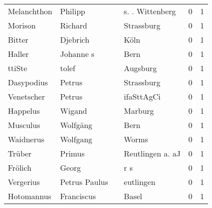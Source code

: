 \documentclass[10pt,a4paper,landscape]{article}
\begin{document}
\begin{longtable}{llllrr}
              Melanchthon &                            Philipp &             &                             s. . Wittenberg &          0 &         1 \\
                  Morison &                            Richard &             &                                  Strassburg &          0 &         1 \\
                   Bitter &                           Djebrich &             &                                        Köln &          0 &         1 \\
                   Haller &                          Johanne s &             &                                        Bern &          0 &         1 \\
                   ttiSte &                              tolef &             &                                    Augsburg &          0 &         1 \\
               Dasypodius &                             Petrus &             &                                  Strassburg &          0 &         1 \\
               Venetscher &                             Petrus &             &                                  ifaSttAgCi &          0 &         1 \\
                 Happelus &                             Wigand &             &                                     Marburg &          0 &         1 \\
                 Musculus &                           Wolfgäng &             &                                        Bern &          0 &         1 \\
                Waidnerus &                           Wolfgang &             &                                       Worms &          0 &         1 \\
                   Trüber &                             Primus &             &                            Reutlingen a. aJ &          0 &         1 \\
                  Frölich &                              Georg &             &                                         r s &          0 &         1 \\
                Vergerius &                      Petrus Paulus &             &                                   eutlingen &          0 &         1 \\
               Hotomannus &                         Franciscus &             &                                       Basel &          0 &         1 \\

\end{longtable}
\end{document}

